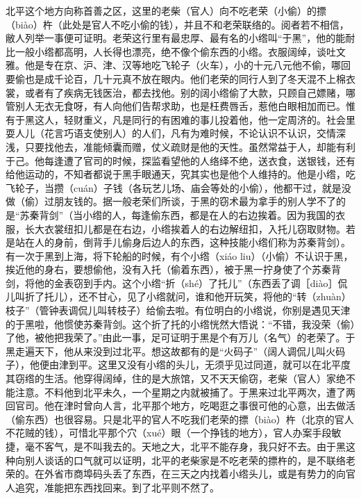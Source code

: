 \documentclass[12pt,UTF8]{ctexbook}
\begin{document}
北平这个地方向称首善之区，这里的老柴（官人）向不吃老荣（小偷）的摽（biào）杵（此处是官人不吃小偷的钱），并且不和老荣联络的。阅者若不相信，敝人列举一事便可证明。老荣这行里有最忠厚、最有名的小绺叫“于黑”，他的能耐比一般小绺都高明，人长得也漂亮，绝不像个偷东西的小绺。衣服阔绰，谈吐文雅。他是专在京、沪、津、汉等地吃飞轮子（火车），小的十元八元他不偷，哪回要偷也是成千论百，几十元真不放在眼内。他们老荣的同行人到了冬天混不上棉衣裳，或者有了疾病无钱医治，都去找他。别的阔小绺偷了大款，只顾自己嫖赌，哪管别人无衣无食呀，有人向他们告帮求助，也是枉费唇舌，惹他白眼相加而已。惟有于黑这人，轻财重义，凡是同行的有困难的事儿投着他，他一定周济的。社会里耍人儿（花言巧语支使别人）的人们，凡有为难时候，不论认识不认识，交情深浅，只要找他去，准能倾囊而赠，仗义疏财是他的天性。虽然常益于人，却能有利于己。他每逢遭了官司的时候，探监看望他的人络绎不绝，送衣食，送银钱，还有给他运动的，不知者都说于黑手眼通天，究其实也是他个人维持的。他是小绺，吃飞轮子，当攒（cuán）子钱（各玩艺儿场、庙会等处的小偷），他都干过，就是没做（偷）过朋友钱的。据一般老荣们所谈，于黑的窃术最为拿手的别人学不了的是“苏秦背剑”（当小绺的人，每逢偷东西，都是在人的右边挨着。因为我国的衣服，长大衣裳纽扣儿都是在右边，小绺挨着人的右边解纽扣，入托儿窃取财物。若是站在人的身前，倒背手儿偷身后边人的东西，这种技能小绺们称为苏秦背剑）。有一次于黑到上海，将下轮船的时候，有个小绺（xiáo liu）（小偷）不认识于黑，挨近他的身右，要想偷他，没有入托（偷着东西），被于黑一拧身使了个苏秦背剑，将他的金表窃到手内。这个小绺“折（shé）了托儿”（东西丢了调［diào］侃儿叫折了托儿），还不甘心，见了小绺就问，谁和他开玩笑，将他的“转（zhuàn）枝子”（管钟表调侃儿叫转枝子）给偷去啦。有位明白的小绺说，你别是遇见天津的于黑啦，他惯使苏秦背剑。这个折了托的小绺恍然大悟说：“不错，我没荣（偷）了他，被他把我荣了。”由此一事，足可证明于黑是个有万儿（名气）的老荣了。于黑走遍天下，他从来没到过北平。想这故都有的是“火码子”（阔人调侃儿叫火码子），他便由津到平。这里又没有小绺的头儿，无须乎见过同道，就可以在北平度其窃绺的生活。他穿得阔绰，住的是大旅馆，又不天天偷窃，老柴（官人）家绝不能注意。不料他到北平未久，一个星期之内就被捕了。于黑来过北平两次，遭了两回官司。他在津时曾向人言，北平那个地方，吃喝逛之事很可他的心意，出去做活（偷东西）也很容易。只是北平的官人不吃我们老荣的摽（biào）杵（北京的官人不花贼的钱），可惜北平那个穴（xué）眼（一个挣钱的地方），官人办案手段敏捷，毫不客气，是不叫我去的。天地之大，北平不能存身，我只好不去。由于黑这种向别人谈话的口气就可以证明，北平的老柴家是不吃老荣的摽杵的，是不联络老荣的。在外省市商埠码头丢了东西，在三天之内找着小绺头儿，或是有势力的向官人追究，准能把东西找回来。到了北平则不然了。
\end{document}
